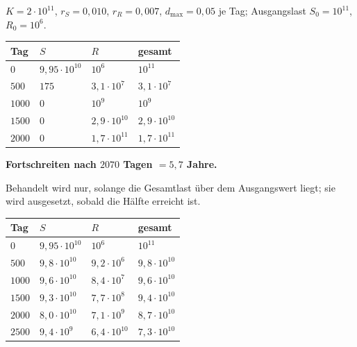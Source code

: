 \begin{merksatz}
$K = 2\cdot10^{11}$, $r_S = 0{,}010$, $r_R = 0{,}007$, $d_{\max} = 0{,}05$ je Tag; Ausgangslast $S_0 = 10^{11}$, $R_0 = 10^{6}$.

\begin{center}
{\small
\renewcommand{\arraystretch}{1.44}
\begin{tabular}{@{}P{1.6cm}P{2.2cm}P{2.2cm}P{2.2cm}@{}}
\toprule
\textbf{Tag} & $S$ & $R$ & \textbf{gesamt}\\
\midrule
$0$ & $9{,}95\cdot10^{10}$ & $10^{6}$ & $10^{11}$\\
$500$ & $175$ & $3{,}1\cdot10^{7}$ & $3{,}1\cdot10^{7}$\\
$1000$ & $0$ & $10^{9}$ & $10^{9}$\\
$1500$ & $0$ & $2{,}9\cdot10^{10}$ & $2{,}9\cdot10^{10}$\\
$2000$ & $0$ & $1{,}7\cdot10^{11}$ & \textcolor{akzent}{$1{,}7\cdot10^{11}$}\\
\bottomrule
\end{tabular}}
\end{center}

\textbf{Fortschreiten nach $2070$ Tagen $= 5{,}7$ Jahre.}

Behandelt wird nur, solange die Gesamtlast über dem Ausgangswert liegt; sie wird ausgesetzt, sobald die Hälfte erreicht ist.

\begin{center}
{\small
\renewcommand{\arraystretch}{1.44}
\begin{tabular}{@{}P{1.6cm}P{2.2cm}P{2.2cm}P{2.2cm}@{}}
\toprule
\textbf{Tag} & $S$ & $R$ & \textbf{gesamt}\\
\midrule
$0$ & $9{,}95\cdot10^{10}$ & $10^{6}$ & $10^{11}$\\
$500$ & $9{,}8\cdot10^{10}$ & $9{,}2\cdot10^{6}$ & $9{,}8\cdot10^{10}$\\
$1000$ & $9{,}6\cdot10^{10}$ & $8{,}4\cdot10^{7}$ & $9{,}6\cdot10^{10}$\\
$1500$ & $9{,}3\cdot10^{10}$ & $7{,}7\cdot10^{8}$ & $9{,}4\cdot10^{10}$\\
$2000$ & $8{,}0\cdot10^{10}$ & $7{,}1\cdot10^{9}$ & $8{,}7\cdot10^{10}$\\
$2500$ & $9{,}4\cdot10^{9}$ & $6{,}4\cdot10^{10}$ & $7{,}3\cdot10^{10}$\\
\bottomrule
\end{tabular}}
\end{center}


\end{merksatz}
